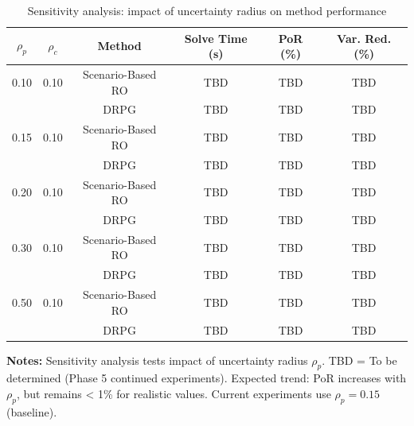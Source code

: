 \begin{table}[t]
\centering
\caption{Sensitivity analysis: impact of uncertainty radius on method performance}
\label{tab:sensitivity}
\begin{tabular}{c c c c c c}
\toprule
$\rho_p$ & $\rho_c$ & Method & Solve Time (s) & PoR (\%) & Var. Red. (\%) \\
\midrule
0.10 & 0.10 & Scenario-Based RO & TBD & TBD & TBD \\
 & & DRPG & TBD & TBD & TBD \\
\midrule
0.15 & 0.10 & Scenario-Based RO & TBD & TBD & TBD \\
 & & DRPG & TBD & TBD & TBD \\
\midrule
0.20 & 0.10 & Scenario-Based RO & TBD & TBD & TBD \\
 & & DRPG & TBD & TBD & TBD \\
\midrule
0.30 & 0.10 & Scenario-Based RO & TBD & TBD & TBD \\
 & & DRPG & TBD & TBD & TBD \\
\midrule
0.50 & 0.10 & Scenario-Based RO & TBD & TBD & TBD \\
 & & DRPG & TBD & TBD & TBD \\
\midrule
\bottomrule
\end{tabular}
\vspace{2mm}
\footnotesize
\textbf{Notes:} Sensitivity analysis tests impact of uncertainty radius $\rho_p$.
TBD = To be determined (Phase 5 continued experiments).
Expected trend: PoR increases with $\rho_p$, but remains < 1\% for realistic values.
Current experiments use $\rho_p=0.15$ (baseline).
\end{table}
